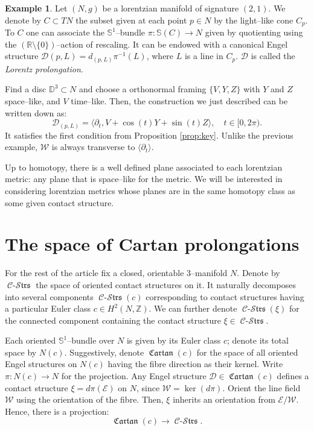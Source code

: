 \documentclass[10pt]{amsart}
\newcommand{\SE}{{\mathcal{E}}}
\newcommand{\SD}{{\mathcal{D}}}
\newcommand{\SW}{{\mathcal{W}}}
\newcommand{\Cartan}{\operatorname{\mathfrak{Cartan}}}
\newcommand{\Cont}{\operatorname{\mathcal{C}-\mathcal{S}\mathfrak{trs}}}
\newcommand{\R}{{\mathbb{R}}}
\newcommand{\NS}{{\mathbb{S}}}
\newcommand{\D}{{\mathbb{D}}}
\theoremstyle{definition}
\newtheorem{example}{Example}
\begin{document}
\begin{example}
Let $(N, g)$ be a lorentzian manifold of signature $(2,1)$. We denote by $C \subset TN$ the subset given at each point $p \in N$ by the light--like cone $C_p$. To $C$ one can associate the $\NS^1$--bundle $\pi: \NS(C) \to N$ given by quotienting using the $(\R \setminus \{0\})$--action of rescaling. It can be endowed with a canonical Engel structure $\SD(p,L) = d_{(p,L)}\pi^{-1}(L)$, where $L$ is a line in $C_p$. $\SD$ is called the \textsl{Lorentz prolongation}.

Find a disc $\D^3 \subset N$ and choose a orthonormal framing $\{V,Y,Z\}$ with $Y$ and $Z$ space--like, and $V$ time--like. Then, the construction we just described can be written down as:
\[ \SD_{(p,L)} = \langle \partial_t, V + \cos(t)Y + \sin(t)Z \rangle, \quad t \in [0,2\pi). \]
It satisfies the first condition from Proposition \ref{prop:key}. Unlike the previous example, $\SW$ is always transverse to $\langle \partial_t \rangle$.
\end{example}

Up to homotopy, there is a well defined plane associated to each lorentzian metric: any plane that is space--like for the metric. We will be interested in considering lorentzian metrics whose planes are in the same homotopy class as some given contact structure.




\section{The space of Cartan prolongations} \label{sec:prolongations}

For the rest of the article fix a closed, orientable $3$--manifold $N$. Denote by $\Cont$ the space of oriented contact structures on it. It naturally decomposes into several components $\Cont(c)$ corresponding to contact structures having a particular Euler class $c \in H^2(N, \mathbb{Z})$. We can further denote $\Cont(\xi)$ for the connected component containing the contact structure $\xi \in \Cont$. 

Each oriented $\mathbb{S}^1$--bundle over $N$ is given by its Euler class $c$; denote its total space by $N(c)$. Suggestively, denote $\Cartan(c)$ for the space of all oriented Engel structures on $N(c)$ having the fibre direction as their kernel. Write $\pi: N(c) \to N$ for the projection. Any Engel structure $\SD \in \Cartan(c)$ defines a contact structure $\xi = d\pi(\SE)$ on $N$, since $\SW = \ker(d\pi)$. Orient the line field $\SW$ using the orientation of the fibre. Then, $\xi$ inherits an orientation from $\SE/\SW$. Hence, there is a projection:
\[ \Cartan(c) \to \Cont. \] 
\end{document}
